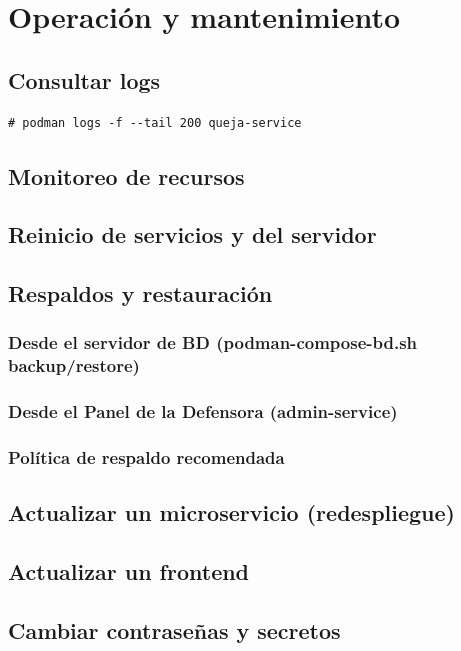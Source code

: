 \section{Operación y mantenimiento}

\subsection{Consultar logs}
\begin{lstlisting}
# podman logs -f --tail 200 queja-service
\end{lstlisting}

\subsection{Monitoreo de recursos}

\subsection{Reinicio de servicios y del servidor}

\subsection{Respaldos y restauración}
\subsubsection{Desde el servidor de BD (podman-compose-bd.sh backup/restore)}
\subsubsection{Desde el Panel de la Defensora (admin-service)}
\subsubsection{Política de respaldo recomendada}

\subsection{Actualizar un microservicio (redespliegue)}

\subsection{Actualizar un frontend}

\subsection{Cambiar contraseñas y secretos}
